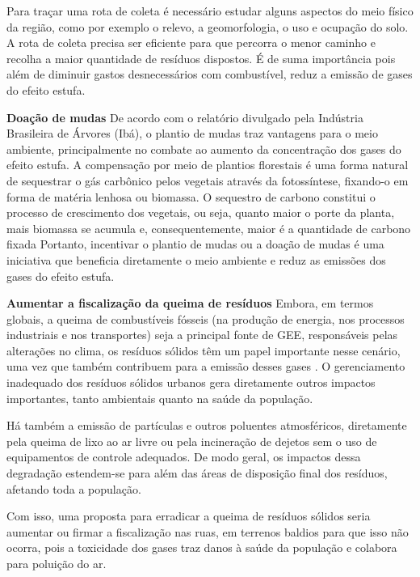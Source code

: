 Para traçar uma rota de coleta é necessário estudar alguns aspectos do meio físico da região, como por exemplo o relevo, a geomorfologia, o uso e ocupação do solo. A rota de coleta precisa ser eficiente para que percorra o menor caminho e recolha a maior quantidade de resíduos dispostos. É de suma importância pois além de diminuir gastos desnecessários com combustível, reduz a emissão de gases do efeito estufa.

\textbf{Doação de mudas}
De acordo com o relatório divulgado pela Indústria Brasileira de Árvores (Ibá), o plantio de mudas traz vantagens para o meio ambiente, principalmente no combate ao aumento da concentração dos gases do efeito estufa.
A compensação por meio de plantios florestais é uma forma
natural de sequestrar o gás carbônico pelos vegetais
através da fotossíntese, fixando-o em forma de matéria
lenhosa ou biomassa. O sequestro de carbono constitui o
processo de crescimento dos vegetais, ou seja, quanto
maior o porte da planta, mais biomassa se acumula e,
consequentemente, maior é a quantidade de carbono fixada \cite{changman_sequestroc_2004} 
Portanto, incentivar o plantio de mudas ou a doação de mudas é uma iniciativa que beneficia diretamente o meio ambiente e reduz as emissões dos gases do efeito estufa.


\textbf{Aumentar a fiscalização da queima de resíduos}
Embora, em termos globais, a queima de combustíveis fósseis (na produção de energia, nos processos industriais e nos transportes) seja a principal fonte de GEE, responsáveis pelas alterações no clima, os resíduos sólidos têm um papel importante nesse cenário, uma vez que também contribuem para a emissão desses gases \cite{IPCC_2008} . O gerenciamento inadequado dos resíduos sólidos urbanos gera diretamente outros impactos importantes, tanto ambientais quanto na saúde da população. \cite{WHO_Europe_2007}

Há também a emissão de partículas e outros poluentes atmosféricos, diretamente pela queima de lixo ao ar livre ou pela incineração de dejetos sem o uso de equipamentos de controle adequados. De modo geral, os impactos dessa degradação estendem-se para além das áreas de disposição final dos resíduos, afetando toda a população.\cite{Gouveia_riscogee_2010}

Com isso, uma proposta para erradicar a queima de resíduos sólidos  seria aumentar ou firmar a fiscalização nas ruas, em terrenos baldios para que isso não ocorra, pois a toxicidade dos gases  traz danos à saúde da população e colabora para poluição do ar.

